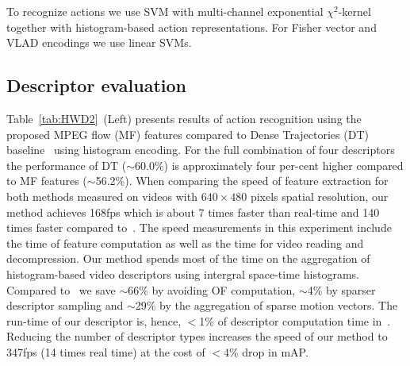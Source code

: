 \documentclass[10pt,twocolumn,letterpaper]{article}
\begin{document}

To recognize actions we use SVM with multi-channel exponential $\chi^2$-kernel~\cite{Zhang07} together with histogram-based action representations. For Fisher vector and VLAD encodings we use linear SVMs.


\subsection{Descriptor evaluation}

Table~\ref{tab:HWD2}~(Left) presents results of action recognition using the proposed MPEG flow (MF) features %
compared to Dense Trajectories (DT) baseline~\cite{Wang12} using histogram encoding. For the full combination of four descriptors the performance of DT ($\sim$60.0\%) is approximately four per-cent higher compared to MF features ($\sim$56.2\%). When comparing the speed of feature extraction for both methods measured on videos with $640\times480$ pixels spatial resolution, our method achieves 168fps which is about 7 times faster than real-time and 140 times faster compared to~\cite{Wang12}. The speed measurements in this experiment include the time of feature computation as well as the time for video reading and decompression. Our method spends most of the time on the aggregation of histogram-based video descriptors using intergral space-time histograms. 
Compared to~\cite{Wang12} we save $\sim$66\% by avoiding OF computation, $\sim$4\% by sparser descriptor sampling and $\sim$29\% by the aggregation of sparse motion vectors. The run-time of our descriptor is, hence, $<$1\% of descriptor computation time in~\cite{Wang12}. Reducing the number of descriptor types increases the speed of our method to 347fps (14 times real time) at the cost of $<$4\% drop in mAP. 
\end{document}
